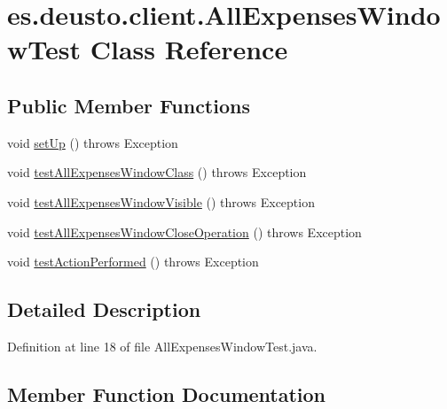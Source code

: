 \hypertarget{classes_1_1deusto_1_1client_1_1_all_expenses_window_test}{}\section{es.\+deusto.\+client.\+All\+Expenses\+Window\+Test Class Reference}
\label{classes_1_1deusto_1_1client_1_1_all_expenses_window_test}
\subsection*{Public Member Functions}
\begin{DoxyCompactItemize}
\item 
void \hyperlink{classes_1_1deusto_1_1client_1_1_all_expenses_window_test_a7bd376b520073c6d7158d57fddc81335}{set\+Up} ()  throws Exception 
\item 
void \hyperlink{classes_1_1deusto_1_1client_1_1_all_expenses_window_test_a98b52032c09251a05a32684d83810394}{test\+All\+Expenses\+Window\+Class} ()  throws Exception 
\item 
void \hyperlink{classes_1_1deusto_1_1client_1_1_all_expenses_window_test_a1eb6a11013fb12fe16453a17e050e81c}{test\+All\+Expenses\+Window\+Visible} ()  throws Exception 
\item 
void \hyperlink{classes_1_1deusto_1_1client_1_1_all_expenses_window_test_a049027a256d872c1999c6bf5f3032c4d}{test\+All\+Expenses\+Window\+Close\+Operation} ()  throws Exception 
\item 
void \hyperlink{classes_1_1deusto_1_1client_1_1_all_expenses_window_test_ae68c0cb0dc8d6e06c88306438423e44d}{test\+Action\+Performed} ()  throws Exception 
\end{DoxyCompactItemize}


\subsection{Detailed Description}


Definition at line 18 of file All\+Expenses\+Window\+Test.\+java.



\subsection{Member Function Documentation}
\mbox{\label{classes_1_1deusto_1_1client_1_1_all_expenses_window_test_a7bd376b520073c6d7158d57fddc81335}} 
